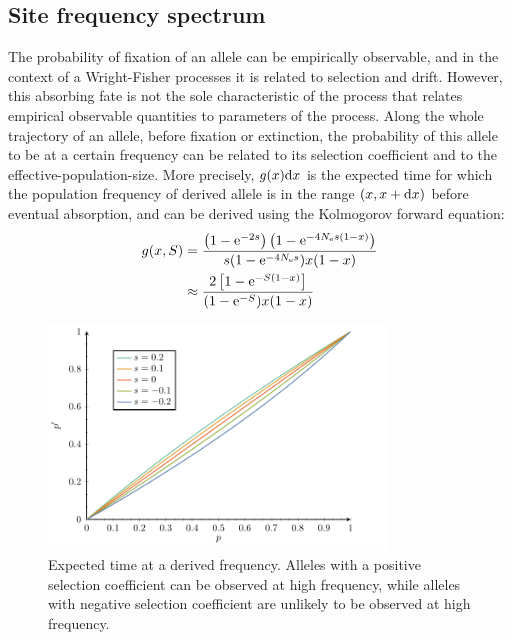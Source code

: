 \subsection{Site frequency spectrum}
The probability of fixation of an \gls{allele} can be empirically observable, and in the context of a Wright-Fisher processes it is related to selection and drift.
However, this absorbing fate is not the sole characteristic of the process that relates empirical observable quantities to parameters of the process.
Along the whole trajectory of an \gls{allele}, before fixation or extinction, the probability of this \gls{allele} to be at a certain frequency can be related to its selection coefficient and to the \gls{effective-population-size}.
More precisely, $g(x) \mathrm{d} x $ is the expected time for which the population frequency of derived \gls{allele} is in the range $(x, x+\mathrm{d} x)$ before eventual absorption, and can be derived using the Kolmogorov forward equation:
\begin{align}
    g(x, S) & = \dfrac{\left( 1 - \mathrm{e}^{- 2 s }\right) \left( 1 - \mathrm{e}^{-4 N_{\textrm{e}} s(1-x)}\right)}{ s (1 - \mathrm{e}^{-4 N_{\textrm{e}} s})x(1-x)} \\
    & \approx \dfrac{2 \left[ 1 - \mathrm{e}^{-S(1-x)}\right]}{(1 - \mathrm{e}^{-S})x(1-x)} \label{eq:expected_time}
\end{align}

\begin{figure}[H]
    \centering
    \includegraphics[width=0.8\textwidth, page=4] {figures.pdf}
    \caption[Expected time at a derived frequency]{
    Expected time at a derived frequency.
    Alleles with a positive selection coefficient can be observed at high frequency, while \glspl{allele} with negative selection coefficient are unlikely to be observed at high frequency.}
\end{figure}

